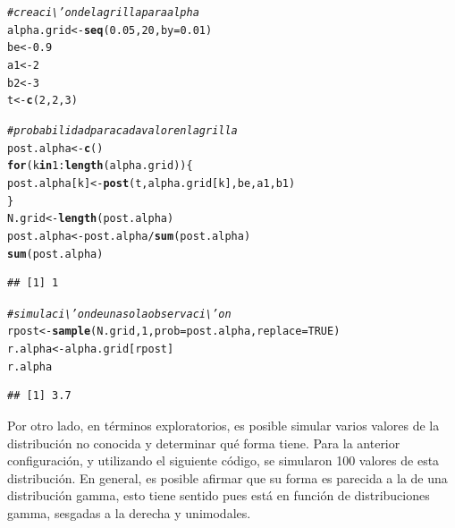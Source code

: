 \documentclass[10pt,openright]{book}\usepackage[]{graphicx}\usepackage[]{color}
\makeatletter
\newcommand{\hlnum}[1]{\textcolor[rgb]{0.686,0.059,0.569}{#1}}%
\newcommand{\hlcom}[1]{\textcolor[rgb]{0.678,0.584,0.686}{\textit{#1}}}%
\newcommand{\hlopt}[1]{\textcolor[rgb]{0,0,0}{#1}}%
\newcommand{\hlstd}[1]{\textcolor[rgb]{0.345,0.345,0.345}{#1}}%
\newcommand{\hlkwa}[1]{\textcolor[rgb]{0.161,0.373,0.58}{\textbf{#1}}}%
\newcommand{\hlkwb}[1]{\textcolor[rgb]{0.69,0.353,0.396}{#1}}%
\newcommand{\hlkwc}[1]{\textcolor[rgb]{0.333,0.667,0.333}{#1}}%
\newcommand{\hlkwd}[1]{\textcolor[rgb]{0.737,0.353,0.396}{\textbf{#1}}}%
\newenvironment{kframe}{%
 \def\at@end@of@kframe{}%
 \ifinner\ifhmode%
  \def\at@end@of@kframe{\end{minipage}}%
  \begin{minipage}{\columnwidth}%
 \fi\fi%
 \def\FrameCommand##1{\hskip\@totalleftmargin \hskip-\fboxsep
 \colorbox{shadecolor}{##1}\hskip-\fboxsep
     \hskip-\linewidth \hskip-\@totalleftmargin \hskip\columnwidth}%
 \MakeFramed {\advance\hsize-\width
   \@totalleftmargin\z@ \linewidth\hsize
   \@setminipage}}%
 {\par\unskip\endMakeFramed%
 \at@end@of@kframe}
\newenvironment{knitrout}{}{} %
\makeatother
\begin{document}
\begin{knitrout}
\color{fgcolor}\begin{kframe}
\begin{alltt}
 \hlcom{# creaci\textbackslash{}'on de la grilla para alpha}
 \hlstd{alpha.grid} \hlkwb{<-} \hlkwd{seq}\hlstd{(}\hlnum{0.05}\hlstd{,} \hlnum{20}\hlstd{,} \hlkwc{by}\hlstd{=}\hlnum{0.01}\hlstd{)}
 \hlstd{be} \hlkwb{<-} \hlnum{0.9}
 \hlstd{a1} \hlkwb{<-} \hlnum{2}
 \hlstd{b2} \hlkwb{<-} \hlnum{3}
 \hlstd{t} \hlkwb{<-} \hlkwd{c}\hlstd{(}\hlnum{2}\hlstd{,}\hlnum{2}\hlstd{,}\hlnum{3}\hlstd{)}

 \hlcom{# probabilidad para cada valor en la grilla}
 \hlstd{post.alpha} \hlkwb{<-} \hlkwd{c}\hlstd{()}
 \hlkwa{for}\hlstd{(k} \hlkwa{in} \hlnum{1}\hlopt{:}\hlkwd{length}\hlstd{(alpha.grid))\{}
  \hlstd{post.alpha[k]} \hlkwb{<-} \hlkwd{post}\hlstd{(t,alpha.grid[k],be,a1,b1)}
 \hlstd{\}}
 \hlstd{N.grid} \hlkwb{<-} \hlkwd{length}\hlstd{(post.alpha)}
 \hlstd{post.alpha} \hlkwb{<-} \hlstd{post.alpha}\hlopt{/}\hlkwd{sum}\hlstd{(post.alpha)}
 \hlkwd{sum}\hlstd{(post.alpha)}
\end{alltt}
\begin{verbatim}
## [1] 1
\end{verbatim}
\begin{alltt}
 \hlcom{# simulaci\textbackslash{}'on de una sola observaci\textbackslash{}'on}
 \hlstd{rpost} \hlkwb{<-} \hlkwd{sample}\hlstd{(N.grid,} \hlnum{1}\hlstd{,} \hlkwc{prob}\hlstd{=post.alpha,} \hlkwc{replace}\hlstd{=}\hlnum{TRUE}\hlstd{)}
 \hlstd{r.alpha} \hlkwb{<-} \hlstd{alpha.grid[rpost]}
 \hlstd{r.alpha}
\end{alltt}
\begin{verbatim}
## [1] 3.7
\end{verbatim}
\end{kframe}
\end{knitrout}

Por otro lado, en t\'erminos exploratorios, es posible simular varios valores de la distribuci\'on no conocida y determinar qu\'e forma tiene. Para la anterior configuraci\'on, y utilizando el siguiente c\'odigo, se simularon 100 valores de esta distribuci\'on. En general, es posible afirmar que su forma es parecida a la de una distribuci\'on gamma, esto tiene sentido pues est\'a en funci\'on de distribuciones gamma, sesgadas a la derecha y unimodales.
\end{document}
